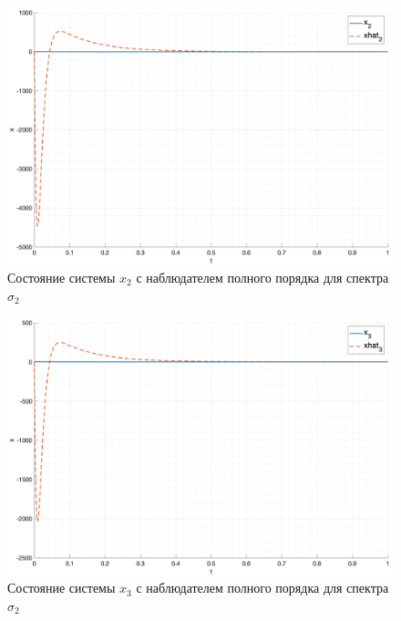 \begin{figure}[ht!]
    \centering
    \includegraphics[width=\textwidth]{media/plots/task2_x2_2.png}
    \caption{Состояние системы $x_2$ с наблюдателем полного порядка для спектра $\sigma_2$}
    \label{fig:task2_x2_2}
\end{figure}

\begin{figure}[ht!]
    \centering
    \includegraphics[width=\textwidth]{media/plots/task2_x3_2.png}
    \caption{Состояние системы $x_3$ с наблюдателем полного порядка для спектра $\sigma_2$}
    \label{fig:task2_x3_2}
\end{figure}

